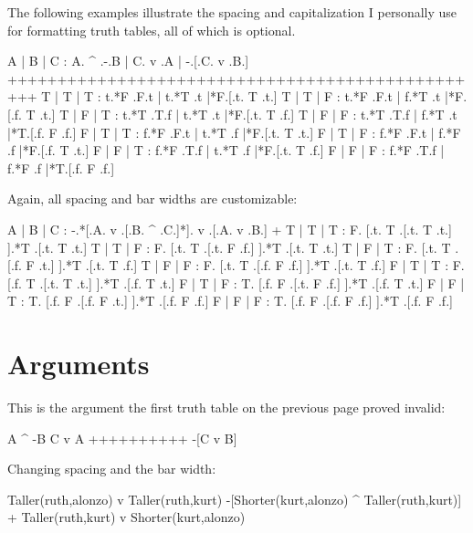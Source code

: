 The following examples illustrate the spacing and capitalization I personally use for formatting truth tables, all of which is optional.

\truthtable
 A | B | C : A. ^ .-.B | C. v .A | -.[.C. v .B.]
+++++++++++++++++++++++++++++++++++++++++++++++++
 T | T | T : t.*F .F.t | t.*T .t |*F.[.t. T .t.]
 T | T | F : t.*F .F.t | f.*T .t |*F.[.f. T .t.]
 T | F | T : t.*T .T.f | t.*T .t |*F.[.t. T .f.]
 T | F | F : t.*T .T.f | f.*T .t |*T.[.f. F .f.]
 F | T | T : f.*F .F.t | t.*T .f |*F.[.t. T .t.]
 F | T | F : f.*F .F.t | f.*F .f |*F.[.f. T .t.]
 F | F | T : f.*F .T.f | t.*T .f |*F.[.t. T .f.]
 F | F | F : f.*F .T.f | f.*F .f |*T.[.f. F .f.]
\endtruthtable

\noindent Again, all spacing and bar widths are customizable:

\truthtablerowheight=12.5pt \truthtablerowdepth=4.5pt%
\truthtablefirstrowdepthadjust=2pt%
\truthtablelinethickness=1.6pt%
\truthtableinteritemspace=6pt%

\truthtable
 A | B | C : -.*[.A. v .[.B. ^ .C.]*]. v .[.A. v .B.]
+
 T | T | T : F. [.t. T .[.t. T .t.] ].*T .[.t. T .t.]
 T | T | F : F. [.t. T .[.t. F .f.] ].*T .[.t. T .t.]
 T | F | T : F. [.t. T .[.f. F .t.] ].*T .[.t. T .f.]
 T | F | F : F. [.t. T .[.f. F .f.] ].*T .[.t. T .f.]
 F | T | T : F. [.f. T .[.t. T .t.] ].*T .[.f. T .t.]
 F | T | F : T. [.f. F .[.t. F .f.] ].*T .[.f. T .t.]
 F | F | T : T. [.f. F .[.f. F .t.] ].*T .[.f. F .f.]
 F | F | F : T. [.f. F .[.f. F .f.] ].*T .[.f. F .f.]
\endtruthtable

\pagebreak

\endquantifiers
\section{Arguments}

This is the argument the first truth table on the previous page proved invalid:

\argument
 A ^ -B
 C v A
++++++++++
 -[C v B]
\endargument

\noindent Changing spacing and the bar width:

\argumentpadding=6pt%
\argumentsidepadding=6pt%
\argumentlinepadding=8pt%
\argumentlinethickness=2pt%

\argument
 Taller(ruth,alonzo) v Taller(ruth,kurt)
 -[Shorter(kurt,alonzo) ^ Taller(ruth,kurt)]
+
 Taller(ruth,kurt) v Shorter(kurt,alonzo)
\endargument

